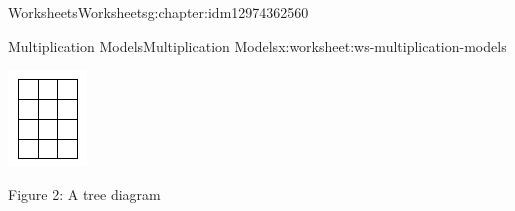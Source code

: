 \documentclass[twoside,11pt,]{book}
\begin{document}
\begin{chapterptx}{Worksheets}{}{Worksheets}{}{}{g:chapter:idm12974362560}
\begin{worksheet-section-numberless}{Multiplication Models}{}{Multiplication Models}{}{}{x:worksheet:ws-multiplication-models}
\begin{introduction}{}
\begin{description}
\begin{sidebyside}{1}{0.45}{0.45}{0}
\begin{sbspanel}{0.1}
\includegraphics[width=1\linewidth]{images/mult-array.png}
\end{sbspanel}%
\end{sidebyside}%
\item[{}]Figure 2: A tree diagram \begin{sidebyside}{1}{0.45}{0.45}{0}%
\begin{sbspanel}{0.1}%

\end{sbspanel}
\end{sidebyside}
\end{description}
\end{introduction}
\end{worksheet-section-numberless}
\end{chapterptx}
\end{document}
